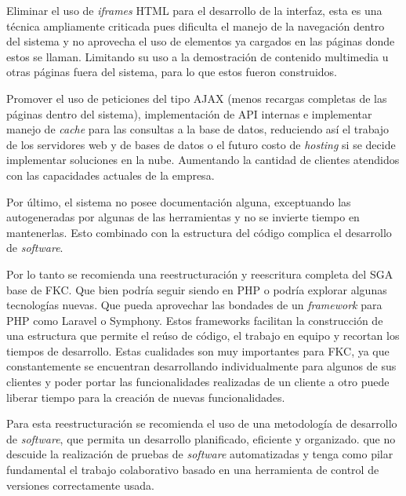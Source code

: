 Eliminar el uso de \emph{iframes} \gls{HTML} para el desarrollo de la interfaz, esta es una técnica ampliamente criticada pues dificulta el manejo de la navegación dentro del sistema y no aprovecha el uso de elementos ya cargados en las páginas donde estos se llaman. Limitando su uso a la demostración de contenido multimedia u otras páginas fuera del sistema, para lo que estos fueron construidos.

Promover el uso de peticiones del tipo \gls{AJAX} (menos recargas completas de las páginas dentro del sistema), implementación de \gls{API} internas e implementar manejo de \emph{cache} para las consultas a la base de datos, reduciendo así el trabajo de los servidores web y de bases de datos o el futuro costo de \emph{hosting} si se decide implementar soluciones en la nube. Aumentando la cantidad de clientes atendidos con las capacidades actuales de la empresa.

Por último, el sistema no posee documentación alguna, exceptuando las autogeneradas por algunas de las herramientas y no se invierte tiempo en mantenerlas. Esto combinado con la estructura del código complica el desarrollo de \emph{software}.

Por lo tanto se recomienda una reestructuración y reescritura completa del \gls{SGA} base de FKC. Que bien podría seguir siendo en PHP o podría explorar algunas tecnologías nuevas. Que pueda aprovechar las bondades de un \emph{framework} para PHP como Laravel o Symphony. Estos frameworks facilitan la construcción de una estructura que permite el reúso de código, el trabajo en equipo y recortan los tiempos de desarrollo. Estas cualidades son muy importantes para FKC, ya que constantemente se encuentran desarrollando individualmente para algunos de sus clientes y poder portar las funcionalidades realizadas de un cliente a otro puede liberar tiempo para la creación de nuevas funcionalidades.

Para esta reestructuración se recomienda el uso de una metodología de desarrollo de \emph{software}, que permita un desarrollo planificado, eficiente y organizado. que no descuide la realización de pruebas de \emph{software} automatizadas y tenga como pilar fundamental el trabajo colaborativo basado en una herramienta de control de versiones correctamente usada.


